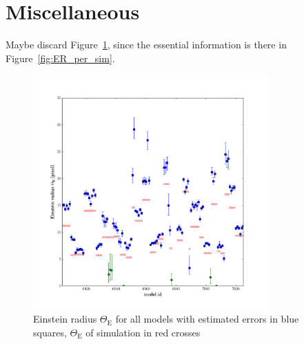 \documentclass[12pt,preprint]{aastex}
\newcommand{\ERg}[1][]{$\Theta_{\text{E#1}}$\xspace} %
\newcommand{\ERf}[1][]{Einstein radius $\Theta_\text{E#1}$\xspace} %
\newcommand{\figref}[1]{Figure~\ref{fig:#1}}
\begin{document}
\section{Miscellaneous}

Maybe discard \figref{ER_all_models}, since the essential information is there in \figref{ER_per_sim}.

\begin{figure}[htbp]
  \centering
    \includegraphics[width=0.80\textwidth]{fig/eR_1}
  \caption{\ERf for all models with estimated errors in blue squares, \ERg of simulation in red crosses}
  \label{fig:ER_all_models}
\end{figure}


\newpage



\end{document}
